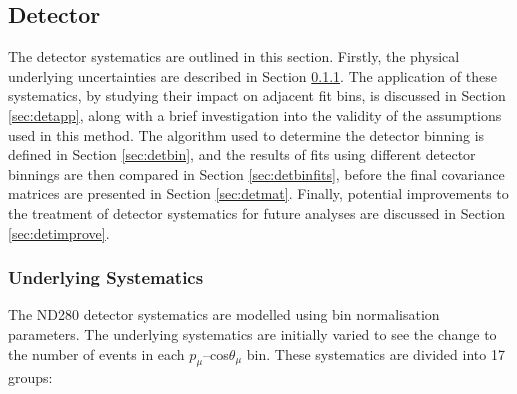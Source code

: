 \subsection{Detector}\label{sec:det}

The detector systematics are outlined in this section. Firstly, the physical underlying uncertainties are described in Section \ref{sec:detsyst}. The application of these systematics, by studying their impact on adjacent fit bins, is discussed in Section \ref{sec:detapp}, along with a brief investigation into the validity of the assumptions used in this method. The algorithm used to determine the detector binning is defined in Section \ref{sec:detbin}, and the results of fits using different detector binnings are then compared in Section \ref{sec:detbinfits}, before the final covariance matrices are presented in Section \ref{sec:detmat}. Finally, potential improvements to the treatment of detector systematics for future analyses are discussed in Section \ref{sec:detimprove}.

\subsubsection{Underlying Systematics}\label{sec:detsyst}

The ND280 detector systematics are modelled using bin normalisation parameters. The underlying systematics are initially varied to see the change to the number of events in each $p_{\mu}$--cos$\theta_{\mu}$ bin. These systematics are divided into 17 groups:

